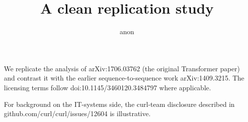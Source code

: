 \documentclass{article}
\title{A clean replication study}
\author{anon}
\begin{document}
\maketitle

We replicate the analysis of arXiv:1706.03762 (the original Transformer paper)
and contrast it with the earlier sequence-to-sequence work
arXiv:1409.3215. The licensing terms follow doi:10.1145/3460120.3484797
where applicable.

For background on the IT-systems side, the curl-team disclosure described in
github.com/curl/curl/issues/12604 is illustrative.



\end{document}

